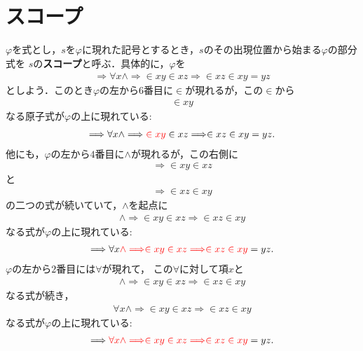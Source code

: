 \documentclass[a4j,10.5pt,oneside,openany]{jsbook}
\theoremstyle{mystyle}
\begin{document}
\section{スコープ}
	$\varphi$を式とし，$s$を$\varphi$に現れた記号とするとき，$s$のその出現位置から始まる$\varphi$の部分式を
	$s$の{\bf スコープ}と呼ぶ．具体的に，$\varphi$を
	\begin{align}
		\Longrightarrow \forall x \wedge \Longrightarrow \in xy \in xz \Longrightarrow \in xz \in xy = yz
	\end{align}
	としよう．このとき$\varphi$の左から$6$番目に$\in$が現れるが，この$\in$から
	\begin{align}
		\in xy
	\end{align}
	なる原子式が$\varphi$の上に現れている:
	\begin{align}
		\Longrightarrow \forall x \wedge \Longrightarrow \textcolor{red}{\in xy} \in xz \Longrightarrow \in xz \in xy = yz.
	\end{align}
	他にも，$\varphi$の左から$4$番目に$\wedge$が現れるが，この右側に
	\begin{align}
		\Longrightarrow \in xy \in xz
	\end{align}
	と
	\begin{align}
		\Longrightarrow \in xz \in xy
	\end{align}
	の二つの式が続いていて，$\wedge$を起点に
	\begin{align}
		\wedge \Longrightarrow \in xy \in xz \Longrightarrow \in xz \in xy
	\end{align}
	なる式が$\varphi$の上に現れている:
	\begin{align}
		\Longrightarrow \forall x \textcolor{red}{\wedge \Longrightarrow \in xy \in xz \Longrightarrow \in xz \in xy} = yz.
	\end{align}
	$\varphi$の左から$2$番目には$\forall$が現れて，
	この$\forall$に対して項$x$と
	\begin{align}
		\wedge \Longrightarrow \in xy \in xz \Longrightarrow \in xz \in xy
	\end{align}
	なる式が続き，
	\begin{align}
		\forall x \wedge \Longrightarrow \in xy \in xz \Longrightarrow \in xz \in xy
	\end{align}
	なる式が$\varphi$の上に現れている:
	\begin{align}
		\Longrightarrow \textcolor{red}{\forall x \wedge \Longrightarrow \in xy \in xz \Longrightarrow \in xz \in xy} = yz.
	\end{align}
	
\end{document}

